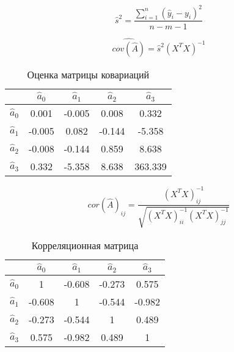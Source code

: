 \documentclass[12pt, a4paper]{article}
\begin{document}

\begin{equation}
	\hat{s}^2 = \frac{\sum_{i = 1}^{n}(\hat{y}_i - y_i)^2}{n - m - 1}
	\label{eq:res_var}
\end{equation}


\begin{equation}
	\hat{cov(\hat A)} = \hat{s}^2 (X^TX)^{-1}
	\label{eq:cov}
\end{equation}

\begin{table}[htb]   
	\centering 
	\begin{tabular}{| c | c | c | c | c |}
		\hline
		$ $ & $\hat a_0$ & $\hat a_1$ & $\hat a_2$ & $\hat a_3$ \\ \hline
		$\hat a_0$ & 0.001 & -0.005 & 0.008 & 0.332 \\ \hline
		$\hat a_1$ & -0.005 & 0.082 & -0.144 & -5.358 \\ \hline
		$\hat a_2$ & -0.008 & -0.144 & 0.859 & 8.638 \\ \hline
		$\hat a_3$ & 0.332 & -5.358 & 8.638 & 363.339 \\
		\hline
	\end{tabular}
	\caption{Оценка матрицы ковариаций}
	\label{tab:cov}
\end{table}


\begin{equation}
	cor(\hat{A})_{ij} = \frac{(X^TX)^{-1}_{ij}}{\sqrt{(X^TX)^{-1}_{ii} (X^TX)^{-1}_{jj}}}
	\label{eq:cor}
\end{equation}

\begin{table}[htb]   
	\centering 
	\begin{tabular}{| c | c | c | c | c |}
		\hline
		$ $ & $\hat a_0$ & $\hat a_1$ & $\hat a_2$ & $\hat a_3$ \\ \hline
		$\hat a_0$ & 1 & -0.608 & -0.273 & 0.575 \\ \hline
		$\hat a_1$ & -0.608 & 1 & -0.544 & -0.982 \\ \hline
		$\hat a_2$ & -0.273 & -0.544 & 1 & 0.489 \\ \hline
		$\hat a_3$ & 0.575 & -0.982 & 0.489 & 1 \\
		\hline
	\end{tabular}
	\caption{Корреляционная матрица}
	\label{tab:cor}
\end{table}
\end{document}
